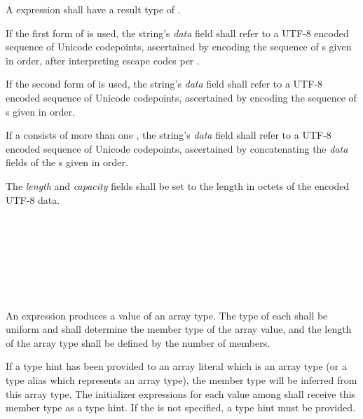 \specsubsubitem
A  expression shall have a result type of
 .

\specsubsubitem
If the first form of  is used, the string's
\textit{data} field shall refer to a \hbox{UTF-8} encoded sequence of Unicode
codepoints, ascertained by encoding the sequence of s
given in order, after interpreting escape codes per
.

\specsubsubitem
If the second form of  is used, the string's
\textit{data} field shall refer to a \hbox{UTF-8} encoded sequence of Unicode
codepoints, ascertained by encoding the sequence of
s given in order.

\specsubsubitem
If a  consists of more than one
, the string's \textit{data} field shall refer to
a \hbox{UTF-8} encoded sequence of Unicode codepoints, ascertained by
concatenating the \textit{data} fields of the s
given in order.

\specsubsubitem
The \textit{length} and \textit{capacity} fields shall be set to the length in
octets of the encoded \hbox{UTF-8} data.


\begin{grammar}
 \\
	\terminal{[}  \terminal{]} \\

 \\
	 \optional{\terminal{,}} \\
	  \\
	 \terminal{,}  \\
\end{grammar}

\specsubsubitem
An  expression produces a value of an array type.
The type of each  shall be uniform and shall
determine the member type of the array value, and the length of the array type
shall be defined by the number of members.

\specsubsubitem
If a type hint has been provided to an array literal which is an array type (or
a type alias which represents an array type), the member type will be inferred
from this array type. The initializer expressions for each value among
 shall receive this member type as a type hint. If
the  is not specified, a type hint must be provided.

